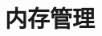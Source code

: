 \documentclass[./operating-systems.tex]{subfiles}
\begin{document}
    \section{内存管理}
\end{document}
